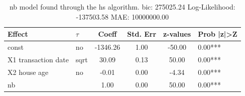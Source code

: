 \begin{table}
	\caption{nb model found through the hs algorithm. bic: 275025.24 Log-Likelihood: -137503.58 MAE: 10000000.00}
	\begin{center}
		\begin{tabular}{|l|l|c|c|c|l|}
			\hline
			Effect & $\tau$ & Coeff & Std. Err & z-values & Prob |z|>Z \\
			\hline
			const & no & -1346.26 & 1.00 & -50.00 & 0.00*** \\
			\hline
			X1 transaction date & sqrt & 30.09 & 0.13 & 50.00 & 0.00*** \\
			\hline
			X2 house age & no & -0.01 & 0.00 & -4.34 & 0.00*** \\
			\hline
			nb &  & 1.00 & 0.00 & 50.00 & 0.00*** \\
			\hline
		\end{tabular}
	\end{center}
\end{table}
